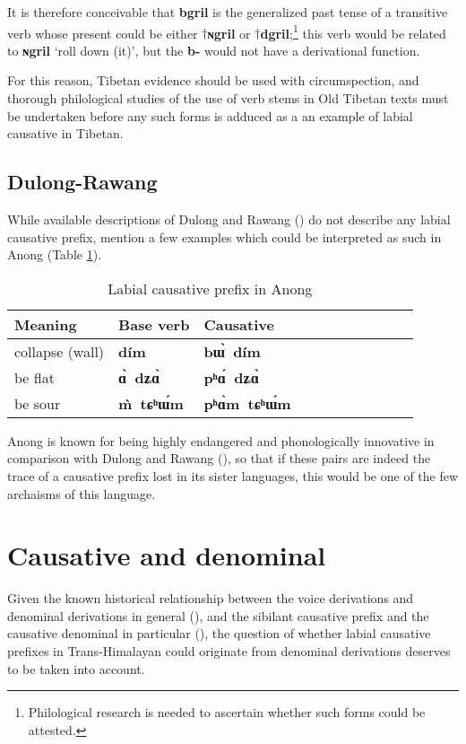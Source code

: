 \documentclass[oneside,a4paper,11pt]{article}
\newcommand{\ipa}[1]{\textbf{{\phon\mbox{#1}}}} %
\newcommand{\forme}[2]{\ipa{#1} `#2'}
\begin{document}
It is therefore conceivable that  \ipa{bgril} is the generalized past tense of a transitive verb whose present could be either $\dagger$\ipa{ɴgril} or $\dagger$\ipa{dgril};\footnote{Philological research is needed to ascertain whether such forms could be attested.} this verb would be related to \forme{ɴgril}{roll down (it)}, but the \ipa{b-} would not have a derivational function. 
 
For this reason, Tibetan evidence should be used with circumspection, and thorough philological studies of the use of verb stems in Old Tibetan texts must be undertaken before any such forms is adduced as a an example of labial causative in Tibetan.

\subsection{Dulong-Rawang}
While available descriptions of Dulong and Rawang (\citealt{sunhk82dulong, lapolla01valency}) do not describe any labial causative prefix, \citet[91]{sunhk05anong} mention a few examples which could be interpreted as  such in Anong (Table \ref{tab:anong}).

\begin{table}[H]
\caption{Labial causative prefix in Anong} \centering \label{tab:anong}
\begin{tabular}{lllllllllll}
\toprule
Meaning & Base verb& Causative \\
\midrule
collapse (wall) & 	\ipa{dím} & 	\ipa{bɯ̀ dím} \\ 
be flat & 	\ipa{ɑ̀ dʑɑ̀} & 	\ipa{pʰɑ́ dʑɑ̀} \\ 
be sour & 	\ipa{m̀ tɕʰɯ́m} & 	\ipa{pʰɑ̀m tɕʰɯ́m} \\ 
\bottomrule
\end{tabular}
\end{table}

Anong is known for being highly endangered and phonologically innovative in comparison with Dulong and Rawang (\citealt[133-152]{sunhk05anong}), so that if these pairs are indeed the trace of a causative prefix lost in its sister languages, this would be one of the few archaisms of this language. 


\section{Causative and denominal} \label{sec:denominal}
Given the known historical relationship between the voice derivations and denominal derivations in general (\citealt{jacques14antipassive}), and the sibilant causative prefix and the causative denominal in particular (\citealt{jacques15causative}), the question of whether labial causative prefixes in Trans-Himalayan could originate from denominal derivations deserves to be taken into account.
\end{document}
